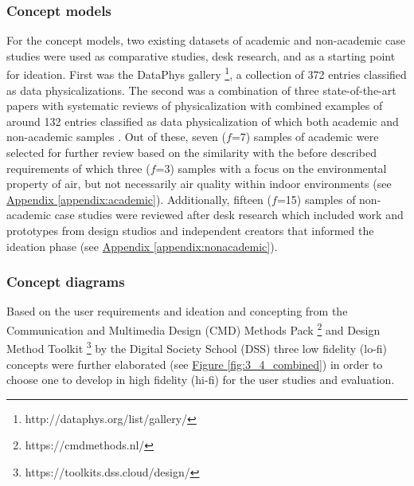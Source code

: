 \subsubsection{Concept models}

For the concept models, two existing datasets of academic and non-academic case studies were used as comparative studies, desk research, and as a starting point for ideation. First was the DataPhys gallery \footnote{http://dataphys.org/list/gallery/}, a collection of 372 entries classified as data physicalizations. The second was a combination of three state-of-the-art papers with systematic reviews of physicalization with combined examples of around 132 entries classified as data physicalization of which both academic and non-academic samples \cite{sauve_physecology_2022, anhalt_university_germany_design_2022, ranasinghe_encoding_2023}. Out of these, seven ($f$=7) samples of academic were selected for further review based on the similarity with the before described requirements of which three ($f$=3) samples with a focus on the environmental property of air, but not necessarily air quality within indoor environments (see \hyperref[appendix:academic]{Appendix \ref*{appendix:academic}}). Additionally, fifteen ($f$=15) samples of non-academic case studies were reviewed after desk research which included work and prototypes from design studios and independent creators that informed the ideation phase (see \hyperref[appendix:nonacademic]{Appendix \ref*{appendix:nonacademic}}).

\subsubsection{Concept diagrams}

Based on the user requirements and ideation and concepting from the Communication and Multimedia Design (CMD) Methods Pack \footnote{https://cmdmethods.nl/} and Design Method Toolkit \footnote{https://toolkits.dss.cloud/design/} by the Digital Society School (DSS) three low fidelity (lo-fi) concepts were further elaborated (see \hyperref[fig:3_4_combined]{Figure \ref*{fig:3_4_combined}}) in order to choose one to develop in high fidelity (hi-fi) for the user studies and evaluation. 


